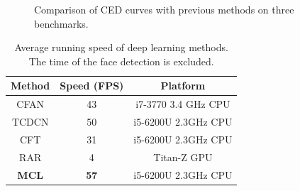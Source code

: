 \documentclass[journal]{IEEEtran}
\begin{document}
\begin{figure}[!htb]
  \centering
  \hspace{0in}
  \hspace{0in}
  \caption{Comparison of CED curves with previous methods on three benchmarks.}
  \label{fig:CED} %
\end{figure}

\begin{table}[!htb]
\centering\caption{Average running speed of deep learning methods. The time of the face detection is excluded.}
\label{tab:comp_time}
\begin{tabular}{|*{3}{c|}}
\hline
Method & Speed (FPS) & Platform\\
\hline
CFAN \cite{zhang2014coarse} &43 &i7-3770 3.4 GHz CPU\\
TCDCN \cite{zhang2015learning} &50 &i5-6200U 2.3GHz CPU\\
CFT \cite{shao2016learning} &31 &i5-6200U 2.3GHz CPU\\
RAR \cite{xiao2016robust} &4 &Titan-Z GPU\\
\textbf{MCL} &\textbf{57} &i5-6200U 2.3GHz CPU\\
\hline
\end{tabular}
\end{table}
\end{document}
